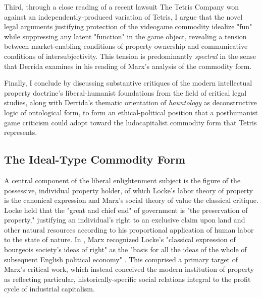 Third, through a close reading of a recent lawsuit The Tetris Company won against an independently-produced variation of Tetris, I argue that the novel legal arguments justifying protection of the videogame commodity idealize "fun" while suppressing any latent "function" in the game object, revealing a tension between market-enabling conditions of property ownership and communicative conditions of intersubjectivity. This tension is predominantly \emph{spectral} in the sense that Derrida examines in his reading of Marx's analysis of the commodity form.

Finally, I conclude by discussing substantive critiques of the modern intellectual property doctrine's liberal-humanist foundations from the field of critical legal studies, along with Derrida's thematic orientation of \emph{hauntology} as deconstructive logic of ontological form, to form an ethical-political position that a posthumanist game criticism could adopt toward the ludocapitalist commodity form that Tetris represents.

\subsection*{The Ideal-Type Commodity Form}
A central component of the liberal enlightenment subject is the figure of the possessive, individual property holder, of which Locke's labor theory of property is the canonical expression and Marx's social theory of value the classical critique. Locke held that the "great and chief end" of government is "the preservation of property," justifying an individual's right to an exclusive claim upon land and other natural resources according to his proportional application of human labor to the state of nature. In , Marx recognized Locke's "classical expression of bourgeois society's ideas of right" as the "basis for all the ideas of the whole of subsequent English political economy" \autocite*[XX-1293a;~pt.~1,~addendum,~sec.~4]{Marx-surplusvalue}. This comprised a primary target of Marx's critical work, which instead conceived the modern institution of property as reflecting particular, historically-specific social relations integral to the profit cycle of industrial capitalism.

